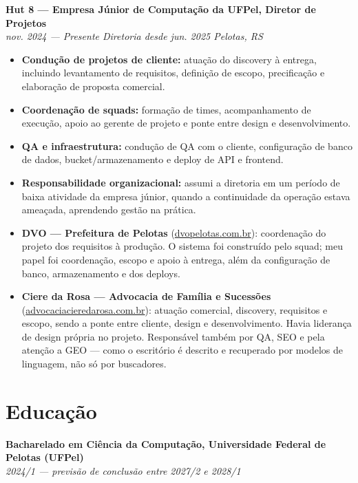 \documentclass[11pt,a4paper]{article}
\newcommand{\entrada}[2]{%
  \vspace{4pt}%
  \noindent\textbf{#1}\\[1pt]%
  {\small\itshape\color{cinza} #2}\par\vspace{2pt}%
}
\begin{document}
\entrada{Hut 8 --- Empresa Júnior de Computação da UFPel, Diretor de Projetos}
        {nov. 2024 --- Presente \textbar{} Diretoria desde jun. 2025 \textbar{} Pelotas, RS}
\begin{itemize}
  \item \textbf{Condução de projetos de cliente:} atuação do discovery à
        entrega, incluindo levantamento de requisitos, definição de escopo,
        precificação e elaboração de proposta comercial.
  \item \textbf{Coordenação de squads:} formação de times, acompanhamento de
        execução, apoio ao gerente de projeto e ponte entre design e
        desenvolvimento.
  \item \textbf{QA e infraestrutura:} condução de QA com o cliente, configuração
        de banco de dados, bucket/armazenamento e deploy de API e frontend.
  \item \textbf{Responsabilidade organizacional:} assumi a diretoria em um
        período de baixa atividade da empresa júnior, quando a continuidade da
        operação estava ameaçada, aprendendo gestão na prática.
  \item \textbf{DVO --- Prefeitura de Pelotas}
        (\href{https://dvopelotas.com.br/}{dvopelotas.com.br}): coordenação do
        projeto dos requisitos à produção. O sistema foi construído pelo squad;
        meu papel foi coordenação, escopo e apoio à entrega, além da
        configuração de banco, armazenamento e dos deploys.
  \item \textbf{Ciere da Rosa --- Advocacia de Família e Sucessões}
        (\href{https://advocaciacieredarosa.com.br/}{advocaciacieredarosa.com.br}):
        atuação comercial, discovery, requisitos e escopo, sendo a ponte entre
        cliente, design e desenvolvimento. Havia liderança de design própria no
        projeto. Responsável também por QA, SEO e pela atenção a GEO --- como o
        escritório é descrito e recuperado por modelos de linguagem, não só por
        buscadores.
\end{itemize}

\section*{Educação}

\entrada{Bacharelado em Ciência da Computação, Universidade Federal de Pelotas (UFPel)}
        {2024/1 --- previsão de conclusão entre 2027/2 e 2028/1}

\end{document}

